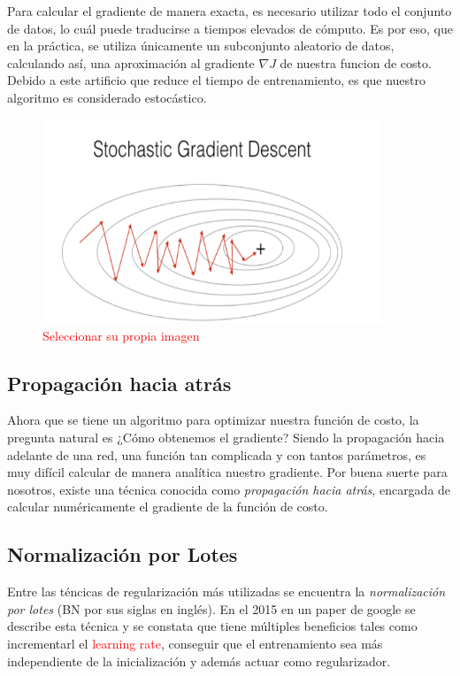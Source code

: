 Para calcular el gradiente de manera exacta, es necesario utilizar todo el conjunto de datos, lo cuál puede traducirse a tiempos elevados de cómputo. Es por eso, que en la práctica, se utiliza únicamente un subconjunto aleatorio de datos, calculando así, una aproximación al gradiente $\nabla J$ de nuestra funcion de costo. Debido a este artificio que reduce el tiempo de entrenamiento, es que nuestro algoritmo es considerado estocástico.
\begin{figure}[H]
    \centering
    \includegraphics[width=4in]{../cap2_CNNs/src/sgd.png}
    \caption{\textcolor{red}{Seleccionar su propia imagen}} 
\end{figure}
\subsection{Propagación hacia atrás}
Ahora que se tiene un algoritmo para optimizar nuestra función de costo, la pregunta natural es ¿Cómo obtenemos el gradiente? Siendo la propagación hacia adelante de una red, una función tan complicada y con tantos parámetros, es muy difícil calcular de manera analítica nuestro gradiente. Por buena suerte para nosotros, existe una técnica conocida como \textsl{propagación hacia atrás}, encargada de calcular numéricamente el gradiente de la función de costo.


\subsection{Normalización por Lotes}
Entre las téncicas de regularización más utilizadas se encuentra la \textsl{normalización por lotes} (BN por sus siglas en inglés). En el 2015 en un paper de google \cite{batchNormalization} se describe esta técnica y se constata que tiene múltiples beneficios tales como incrementarl el \textcolor{red}{learning rate}, conseguir que el entrenamiento sea más independiente de la inicialización y además actuar como regularizador.

